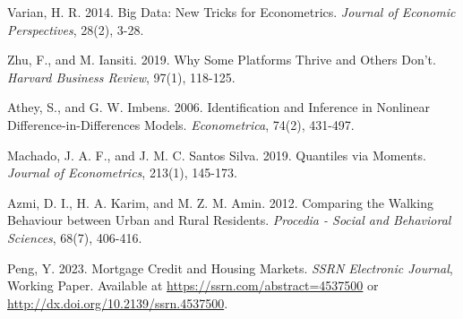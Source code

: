 \documentclass[11pt]{article}
\begin{document}
\begin{singlespace}
\begin{thebibliography}{}
  Varian, H. R. 2014. Big Data: New Tricks for Econometrics. \textit{Journal of Economic Perspectives}, 28(2), 3-28.
  
  Zhu, F., and M. Iansiti. 2019. Why Some Platforms Thrive and Others Don't. \textit{Harvard Business Review}, 97(1), 118-125.
  
  Athey, S., and G. W. Imbens. 2006. Identification and Inference in Nonlinear Difference-in-Differences Models. \textit{Econometrica}, 74(2), 431-497.%

Machado, J. A. F., and J. M. C. Santos Silva. 2019. Quantiles via Moments. \textit{Journal of Econometrics}, 213(1), 145-173.

Azmi, D. I., H. A. Karim, and M. Z. M. Amin. 2012. Comparing the Walking Behaviour between Urban and Rural Residents. \textit{Procedia - Social and Behavioral Sciences}, 68(7), 406-416. %

Peng, Y. 2023. Mortgage Credit and Housing Markets. \textit{SSRN Electronic Journal}, Working Paper. Available at \url{https://ssrn.com/abstract=4537500} or \url{http://dx.doi.org/10.2139/ssrn.4537500}.
  \end{thebibliography}
\end{singlespace}

































\end{document}
